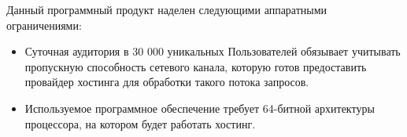 
Данный программный продукт наделен следующими аппаратными ограничениями:
\begin{itemize}
  \item Суточная аудитория в 30 000 уникальных Пользователей обязывает учитывать пропускную способность сетевого канала, которую готов предоставить провайдер хостинга для обработки такого потока запросов.
  \item Используемое программное обеспечение требует 64-битной архитектуры процессора, на котором будет работать хостинг.
\end{itemize}